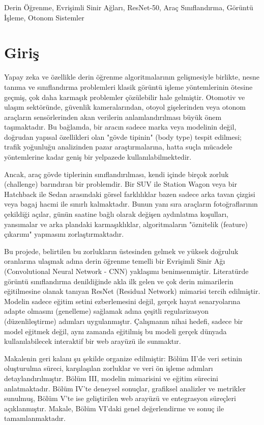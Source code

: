\documentclass[conference]{IEEEtran}
\begin{document}
\begin{IEEEkeywords}
Derin Öğrenme, Evrişimli Sinir Ağları, ResNet-50, Araç Sınıflandırma, Görüntü İşleme, Otonom Sistemler
\end{IEEEkeywords}

\section{Giriş}
Yapay zeka ve özellikle derin öğrenme algoritmalarının gelişmesiyle birlikte, nesne tanıma ve sınıflandırma problemleri klasik görüntü işleme yöntemlerinin ötesine geçmiş, çok daha karmaşık problemler çözülebilir hale gelmiştir. Otomotiv ve ulaşım sektöründe, güvenlik kameralarından, otoyol gişelerinden veya otonom araçların sensörlerinden akan verilerin anlamlandırılması büyük önem taşımaktadır. Bu bağlamda, bir aracın sadece marka veya modelinin değil, doğrudan yapısal özellikleri olan "gövde tipinin" (body type) tespit edilmesi; trafik yoğunluğu analizinden pazar araştırmalarına, hatta suçla mücadele yöntemlerine kadar geniş bir yelpazede kullanılabilmektedir.

Ancak, araç gövde tiplerinin sınıflandırılması, kendi içinde birçok zorluk (challenge) barındıran bir problemdir. Bir SUV ile Station Wagon veya bir Hatchback ile Sedan arasındaki görsel farklılıklar bazen sadece arka tavan çizgisi veya bagaj hacmi ile sınırlı kalmaktadır. Bunun yanı sıra araçların fotoğraflarının çekildiği açılar, günün saatine bağlı olarak değişen aydınlatma koşulları, yansımalar ve arka plandaki karmaşıklıklar, algoritmaların "öznitelik (feature) çıkarımı" yapmasını zorlaştırmaktadır. 

Bu projede, belirtilen bu zorlukların üstesinden gelmek ve yüksek doğruluk oranlarına ulaşmak adına derin öğrenme temelli bir Evrişimli Sinir Ağı (Convolutional Neural Network - CNN) yaklaşımı benimsenmiştir. Literatürde görüntü sınıflandırma denildiğinde akla ilk gelen ve çok derin mimarilerin eğitilmesine olanak tanıyan ResNet (Residual Network) mimarisi tercih edilmiştir. Modelin sadece eğitim setini ezberlemesini değil, gerçek hayat senaryolarına adapte olmasını (genelleme) sağlamak adına çeşitli regularizasyon (düzenlileştirme) adımları uygulanmıştır. Çalışmanın nihai hedefi, sadece bir model eğitmek değil, aynı zamanda eğitilmiş bu modeli gerçek dünyada kullanılabilecek interaktif bir web arayüzü ile sunmaktır.

Makalenin geri kalanı şu şekilde organize edilmiştir: Bölüm II'de veri setinin oluşturulma süreci, karşılaşılan zorluklar ve veri ön işleme adımları detaylandırılmıştır. Bölüm III, modelin mimarisini ve eğitim sürecini anlatmaktadır. Bölüm IV'te deneysel sonuçlar, grafiksel analizler ve metrikler sunulmuş, Bölüm V'te ise geliştirilen web arayüzü ve entegrasyon süreçleri açıklanmıştır. Makale, Bölüm VI'daki genel değerlendirme ve sonuç ile tamamlanmaktadır.
\end{document}
